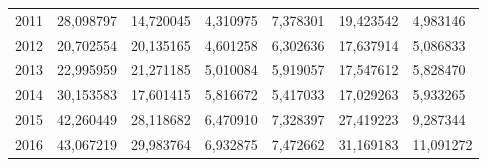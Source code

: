 \begin{table}
\begin{tabular}{p{1cm}p{2cm}p{2cm}p{2cm}p{2cm}p{2cm}p{2cm}}
 2011 &       28,098797 &           14,720045 &                                    4,310975 &     7,378301 &            19,423542 &                          4,983146 \\
 2012 &       20,702554 &           20,135165 &                                    4,601258 &     6,302636 &            17,637914 &                          5,086833 \\
 2013 &       22,995959 &           21,271185 &                                    5,010084 &     5,919057 &            17,547612 &                          5,828470 \\
 2014 &       30,153583 &           17,601415 &                                    5,816672 &     5,417033 &            17,029263 &                          5,933265 \\
 2015 &       42,260449 &           28,118682 &                                    6,470910 &     7,328397 &            27,419223 &                          9,287344 \\
 2016 &       43,067219 &           29,983764 &                                    6,932875 &     7,472662 &            31,169183 &                         11,091272 \\
\bottomrule
\end{tabular}
\end{table}
